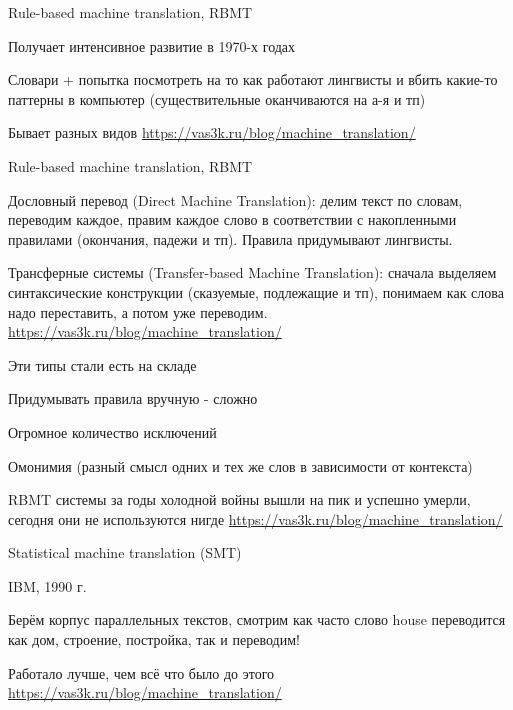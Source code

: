 \documentclass[notes,12pt, aspectratio=169]{beamer}
\newenvironment{wideitemize}{\itemize\addtolength{\itemsep}{10pt}}{\enditemize}
\begin{document}
\begin{frame}{Rule-based machine translation, RBMT}
	\begin{wideitemize} 
		\item  Получает интенсивное развитие в 1970-х годах
		\item  Словари + попытка посмотреть на то как работают лингвисты и вбить какие-то паттерны в компьютер (существительные оканчиваются на а-я и тп)
		\item Бывает разных видов
	\end{wideitemize} 
	\vfill
\footnotesize  {\color{blue} \url{https://vas3k.ru/blog/machine_translation/}} 
\end{frame} 


\begin{frame}{Rule-based machine translation, RBMT}
	\begin{wideitemize} 
		\item   \alert{Дословный перевод (Direct Machine Translation):}  делим текст по словам, переводим каждое, правим каждое слово в соответствии с накопленными правилами (окончания, падежи и тп). Правила придумывают лингвисты.
		\item  \alert{Трансферные системы (Transfer-based Machine Translation):} сначала выделяем синтаксические конструкции (сказуемые, подлежащие и тп), понимаем как слова надо переставить, а потом уже переводим.
	\end{wideitemize} 
	\vfill
	\footnotesize  {\color{blue} \url{https://vas3k.ru/blog/machine_translation/}} 
\end{frame} 


\begin{frame}{Эти типы стали есть на складе}
	\begin{wideitemize} 
		\item  Придумывать правила вручную - сложно
		\item  Огромное количество исключений
		\item  Омонимия (разный смысл одних и тех же слов в зависимости от контекста)
		\item  RBMT системы за годы холодной войны вышли на пик и успешно умерли, сегодня они не используются нигде
	\end{wideitemize} 
	\vfill
	\footnotesize  {\color{blue} \url{https://vas3k.ru/blog/machine_translation/}} 
\end{frame} 


\begin{frame}{Statistical machine translation (SMT)}
	\begin{wideitemize} 
		\item  IBM, 1990 г.
		\item  Берём корпус параллельных текстов, смотрим как часто слово house
		переводится как дом, строение, постройка, так и переводим!
		\item  Работало лучше, чем всё что было до этого
	\end{wideitemize} 
	\vfill
	\footnotesize  {\color{blue} \url{https://vas3k.ru/blog/machine_translation/}} 
\end{frame} 
\end{document}
